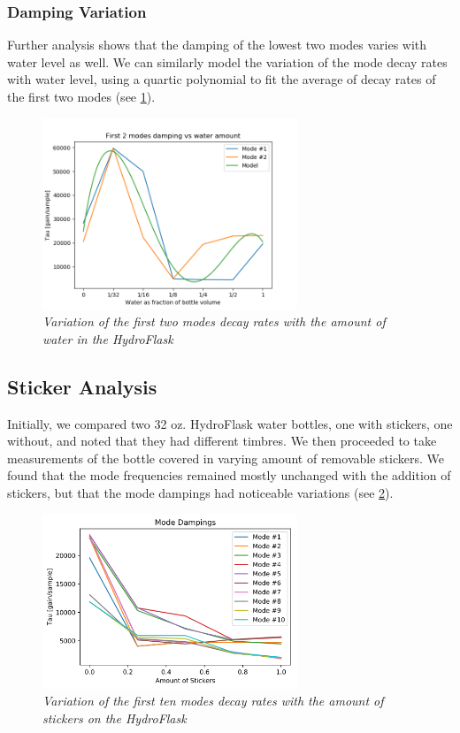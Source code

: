 \documentclass[twoside,a4paper]{article}
\begin{document}
\subsubsection{Damping Variation} \label{sec:water-damp}
%
Further analysis shows that the damping of the lowest two modes
varies with water level as well. We can similarly model the
variation of the mode decay rates with water level, using a
quartic polynomial to fit the average of decay rates of the first
two modes (see \cref{fig:water-mode-damp}).
%
\begin{figure}[!htb]
    \centering
    \includegraphics[width=3in]{../Figures/Water_Damping}
    \caption{\it{Variation of the first two modes decay rates
                 with the amount of water in the HydroFlask}}
    \label{fig:water-mode-damp}
\end{figure}
%
\subsection{Sticker Analysis} \label{sec:sticker}
%
Initially, we compared two 32 oz. HydroFlask water bottles, one
with stickers, one without, and noted that they had different
timbres. We then proceeded to take measurements of the
bottle covered in varying amount of removable stickers. We found
that the mode frequencies remained mostly unchanged with the
addition of stickers, but that the mode dampings had noticeable
variations (see \cref{fig:sticker-mode-damp}).
%
\begin{figure}[!htb]
    \centering
    \includegraphics[width=3in]{../Figures/StickerDamping}
    \caption{\it{Variation of the first ten modes decay rates
                 with the amount of stickers on the HydroFlask}}
    \label{fig:sticker-mode-damp}
\end{figure}
%
\end{document}
